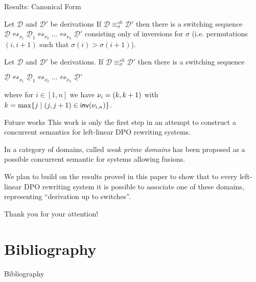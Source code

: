 \documentclass[usenames,dvipsnames]{beamer}
\newcommand{\shift}[1]{\ensuremath{\mathrel{{\leftrightsquigarrow}_{#1}}}}
\newcommand{\shifteq}[1][]{\ensuremath{\mathrel{{\equiv}^\mathit{sh}_{#1}}}}
\newcommand{\dder}[1]{\mathscr{#1}}
\newcommand{\inv}[1]{\mathsf{inv}({#1})}
\newcommand{\der}[1]{\underline{\dder{#1}}}
\begin{document}
\begin{frame}{Results: Canonical Form}\justifying
	
	\begin{theorem}
		Let $\der{D}$ and $\der{D}'$ be derivations If $\der{D} \shifteq[\sigma] \der{D}'$ then there is a switching sequence 
		$\der{D} \shift{\nu_1} \der{D}_1 \shift{\nu_2} \ldots
		\shift{\nu_n} \der{D}'$
		consisting only of inversions for $\sigma$ (i.e. permutations $(i, i+1)$ such that $\sigma(i)>\sigma(i+1)$).
	\end{theorem}
\pause 	
\begin{theorem}
	Let $\der{D}$ and $\der{D}'$ be derivations. If
	$\der{D} \shifteq[\sigma]\der{D}'$ then there is a switching sequence
	\begin{center}
		$\der{D} \shift{\nu_1} \der{D}_1 \shift{\nu_2} \ldots
		\shift{\nu_n} \der{D}'$
	\end{center}
	where for $i \in [1,n]$ we have $\nu_i  = \transp{k}$ with 
	$k = \max \{ j \mid \transp{j} \in \inv{\nu_{i,n}}\}$.
\end{theorem}
\end{frame}


\begin{frame}{Future works}\justifying 
	This work is only the first step in an attempt to construct a concurrent semantics for left-linear DPO rewriting systems.
	
	\smallskip \pause 
	
	In \cite{baldan2017domains} a category of domains, called \emph{weak prime domains} has been proposed as a possible concurrent semantic for systems allowing fusions. 	
	
	\smallskip \pause We plan to build on the results proved in this paper to show that to every left-linear DPO rewriting system it is possible to associate one of these domains, representing ``derivation up to switches''.
\end{frame}

\begin{frame}{\hspace{1pt}}
	\LARGE
	\begin{center}
		Thank you for your attention!
	\end{center}
	
\end{frame}


\section{Bibliography}
\begin{frame}[allowframebreaks]{Bibliography}\justifying 
\printbibliography
\end{frame}
\end{document}
